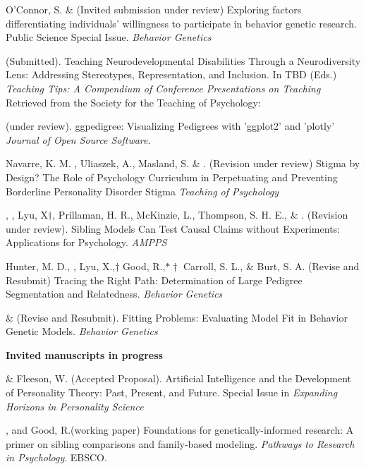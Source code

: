 \begin{etaremune}
\item O'Connor, S. \& \meb (Invited submission under review) Exploring factors differentiating individuals’ willingness to participate in behavior genetic research. Public Science Special Issue. \textit{Behavior Genetics}
\item \meb (Submitted). Teaching Neurodevelopmental Disabilities Through a Neurodiversity Lens: Addressing Stereotypes, Representation, and Inclusion.  In TBD  (Eds.) \textit{Teaching Tips: A Compendium of Conference Presentations on Teaching} Retrieved from the Society for the Teaching of Psychology: \href{http://teachpsych.org/ebooks/}{\small\color{blue}{teachpsych.org/ebooks/}}

\item \meb  (under review). ggpedigree: Visualizing Pedigrees with 'ggplot2' and 'plotly' \textit{Journal of Open Source Software}. \href{https://joss.theoj.org/papers/e5116b83b03e2740960d1153c45f9480}{\small\color{blue}{submission}}


\item Navarre, K. M. \noteB, Uliaszek, A., Masland, S. \& \meb. (Revision under review) Stigma by Design? The Role of Psychology Curriculum in Perpetuating and Preventing Borderline Personality Disorder Stigma \textit{Teaching of Psychology}

\item \meb, \jt, Lyu, X$\dagger$, Prillaman, H. R.\noteA, McKinzie, L.\noteA, Thompson, S. H. E.\noteA, \& \joe. (Revision under review). Sibling Models Can Test Causal Claims without Experiments: Applications for Psychology. \href{https://osf.io/zpdwt/}{\small\color{blue}{osf.io/zpdwt/}} \textit{AMPPS} %


\item Hunter, M. D., \meb, Lyu, X.,$\dagger$ Good, R.,$*\dagger$ Carroll, S. L., \& Burt, S. A. (Revise and Resubmit) Tracing the Right Path: Determination of Large Pedigree Segmentation and Relatedness. \textit{Behavior Genetics}


\item \meb \& \joe (Revise and Resubmit). Fitting Problems: Evaluating Model Fit in Behavior Genetic Models. \textit{Behavior Genetics}  \href{https://doi.org/10.31234/osf.io/qys83}{\small\color{blue}{10.31234/osf.io/qys83}}
\end{etaremune}
{\large \textbf{Invited manuscripts in progress}}
\begin{etaremune}


\item \meb \& Fleeson, W. (Accepted Proposal). Artificial Intelligence and the Development of Personality Theory: Past, Present, and Future. Special Issue in \textit{Expanding Horizons in Personality Science}


\item \meb, and Good, R.\noteA (working paper) Foundations for genetically-informed research: A primer on sibling comparisons and family-based modeling. \textit{Pathways to Research in Psychology}. EBSCO.
\end{etaremune}
